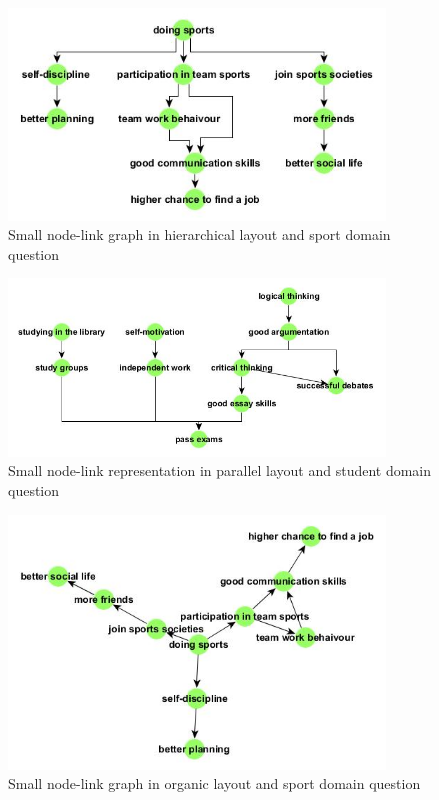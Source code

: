 \documentclass{l4proj}
\begin{document}
\begin{appendices}
\begin{figure}[H]
\centering
\includegraphics[width=10cm]{images/sportSmallHier.jpg}
\caption{Small node-link graph in hierarchical layout and sport domain question}
\label{sportSmallHier}
\end{figure}


\begin{figure}[H]
\centering
\includegraphics[width=10cm]{images/studentSmallParallel.jpg}
\caption{Small node-link representation in parallel layout and student domain question}
\label{studentSmallInDD}
\end{figure}


\begin{figure}[H]
\centering
\includegraphics[width=10cm]{images/sportSmallOrganic.jpg}
\caption{Small node-link graph in organic layout and sport domain question}
\label{sportSmallOrganic}
\end{figure}


\end{appendices}
\end{document}
